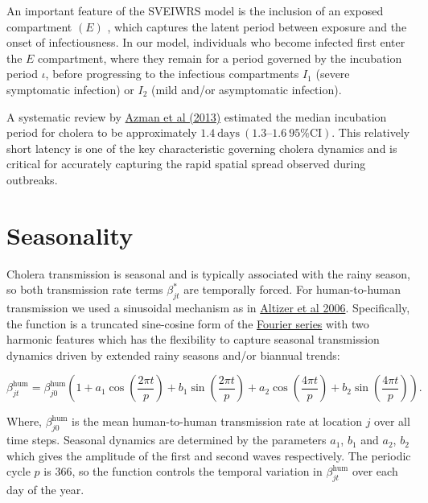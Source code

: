 \documentclass[
]{book}
\begin{document}
An important feature of the SVEIWRS model is the inclusion of an exposed compartment \(\left(E\right)\) , which captures the latent period between exposure and the onset of infectiousness. In our model, individuals who become infected first enter the \(E\) compartment, where they remain for a period governed by the incubation period \(\iota\), before progressing to the infectious compartments \(I_1\) (severe symptomatic infection) or \(I_2\) (mild and/or asymptomatic infection).

A systematic review by \href{http://www.sciencedirect.com/science/article/pii/S0163445312003477}{Azman et al (2013)} estimated the median incubation period for cholera to be approximately \(1.4 \ \text{days} \ (1.3–1.6 \ 95\% \text{CI})\). This relatively short latency is one of the key characteristic governing cholera dynamics and is critical for accurately capturing the rapid spatial spread observed during outbreaks.

\section{Seasonality}\label{seasonality}

Cholera transmission is seasonal and is typically associated with the rainy season, so both transmission rate terms \(\beta_{jt}^{\text{*}}\) are temporally forced. For human-to-human transmission we used a sinusoidal mechanism as in \href{https://onlinelibrary.wiley.com/doi/epdf/10.1111/j.1461-0248.2005.00879.x}{Altizer et al 2006}. Specifically, the function is a truncated sine-cosine form of the \href{https://en.wikipedia.org/wiki/Fourier_series}{Fourier series} with two harmonic features which has the flexibility to capture seasonal transmission dynamics driven by extended rainy seasons and/or biannual trends:

\begin{equation}
\beta_{jt}^{\text{hum}} = \beta_{j0}^{\text{hum}} \left(1 + a_1 \cos\left(\frac{2\pi t}{p}\right) + b_1 \sin\left(\frac{2\pi t}{p}\right) + a_2 \cos\left(\frac{4\pi t}{p}\right) + b_2 \sin\left(\frac{4\pi t}{p}\right)\right).
\label{eq:beta1}
\end{equation}

Where, \(\beta_{j0}^{\text{hum}}\) is the mean human-to-human transmission rate at location \(j\) over all time steps. Seasonal dynamics are determined by the parameters \(a_1\), \(b_1\) and \(a_2\), \(b_2\) which gives the amplitude of the first and second waves respectively. The periodic cycle \(p\) is 366, so the function controls the temporal variation in \(\beta_{jt}^{\text{hum}}\) over each day of the year.
\end{document}
